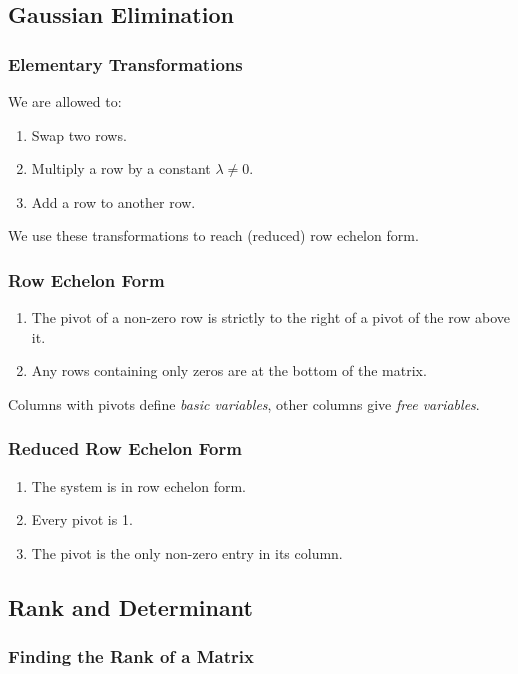 \documentclass[10pt,twoside,twocolumn]{article}
\begin{document}
\subsection{Gaussian Elimination}


\subsubsection{Elementary Transformations}

We are allowed to: 
\begin{enumerate}
\item Swap two rows. 
\item Multiply a row by a constant $\lambda\neq0$. 
\item Add a row to another row. 
\end{enumerate}
We use these transformations to reach (reduced) row echelon form.


\subsubsection{Row Echelon Form}
\begin{enumerate}
\item The pivot of a non-zero row is strictly to the right of a pivot of
the row above it. 
\item Any rows containing only zeros are at the bottom of the matrix. 
\end{enumerate}
Columns with pivots define \emph{basic variables}, other columns give
\emph{free variables}.


\subsubsection{Reduced Row Echelon Form}
\begin{enumerate}
\item The system is in row echelon form. 
\item Every pivot is 1. 
\item The pivot is the only non-zero entry in its column. 
\end{enumerate}

\subsection{Rank and Determinant}


\subsubsection{Finding the Rank of a Matrix}
\end{document}
